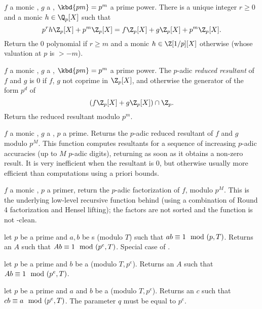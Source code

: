  $f$ a monic ,
$g$ a , $\kbd{pm} = p^m$ a prime power. There is a unique integer
$r\geq 0$ and a monic $h\in \Q_p[X]$ such that
$$p^rh\Z_p[X] + p^m\Z_p[X] = f\Z_p[X] + g\Z_p[X] + p^m\Z_p[X].$$
Return the $0$ polynomial if $r\geq m$ and a monic $h\in\Z[1/p][X]$ otherwise
(whose valuation at $p$ is $> -m$).

 $f$ a monic
, $g$ a , $\kbd{pm} = p^m$ a prime power. The $p$-adic
\emph{reduced resultant} of $f$ and $g$ is
$0$ if $f$, $g$ not coprime in $\Z_p[X]$, and otherwise the generator of the
form $p^d$ of
$$ (f\Z_p[X] + g\Z_p[X])\cap \Z_p. $$
Return the reduced resultant modulo $p^m$.

 $f$
a monic , $g$ a , $p$ a prime. Returns
the $p$-adic reduced resultant of $f$ and $g$ modulo $p^M$. This function
computes resultants for a sequence of increasing $p$-adic accuracies
(up to $M$ $p$-adic digits), returning as soon as it obtains a non-zero
result. It is very inefficient when the resultant is $0$, but otherwise
usually more efficient than computations using a priori bounds.

 $f$ a monic
, $p$ a primer, return the $p$-adic factorization of $f$, modulo
$p^M$. This is the underlying low-level recursive function behind
 (using a combination of Round 4 factorization and Hensel
lifting); the factors are not sorted and the function is not
-clean.


 let
$p$ be a prime  and $a,b$ be s (modulo $T$) such that $a\*b
\equiv 1 \mod (p,T)$.  Returns an  $A$ such that
$A\*b \equiv 1 \mod (p^e, T)$.  Special case of .

 let
$p$ be a prime  and $b$ be a  (modulo $T, p^e$).
Returns an  $A$ such that $A\*b \equiv 1 \mod (p^e, T)$.

 let
$p$ be a prime  and $a$ and $b$ be a  (modulo $T, p^e$).
Returns an  $c$ such that $c\*b \equiv a \mod (p^e, T)$.
The parameter $q$ must be equal to $p^e$.

